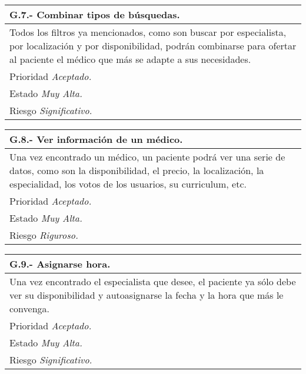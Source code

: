 \documentclass[a4paper,oneside,11pt]{book}
\begin{document}
\begin{center}
\begin{tabulary}{15cm}{|L|}
	\hline
		\bf{G.7.- Combinar tipos de búsquedas.} \\
	\hline
		Todos los filtros ya mencionados, como son buscar por especialista, por localización y por disponibilidad, podrán combinarse para ofertar al paciente el médico que más se adapte a sus necesidades. \\
	\hline
		Prioridad \textit{Aceptado.} \\
	\hline
		Estado \textit{Muy Alta.} \\
	\hline
		Riesgo \textit{Significativo.} \\
	\hline
\end{tabulary}
\end{center}

\begin{center}
\begin{tabulary}{15cm}{|L|}
	\hline
		\bf{G.8.- Ver información de un médico.} \\
	\hline
		Una vez encontrado un médico, un paciente podrá ver una serie de datos, como son la disponibilidad, el precio, la localización, la especialidad, los votos de los usuarios, su curriculum, etc. \\
	\hline
		Prioridad \textit{Aceptado.} \\
	\hline
		Estado \textit{Muy Alta.} \\
	\hline
		Riesgo \textit{Riguroso.} \\
	\hline
\end{tabulary}
\end{center}

\begin{center}
\begin{tabulary}{15cm}{|L|}
	\hline
		\bf{G.9.- Asignarse hora.} \\
	\hline
		Una vez encontrado el especialista que desee, el paciente ya sólo debe ver su disponibilidad y autoasignarse la fecha y la hora que más le convenga. \\
	\hline
		Prioridad \textit{Aceptado.} \\
	\hline
		Estado \textit{Muy Alta.} \\
	\hline
		Riesgo \textit{Significativo.} \\
	\hline
\end{tabulary}
\end{center}
\end{document}
